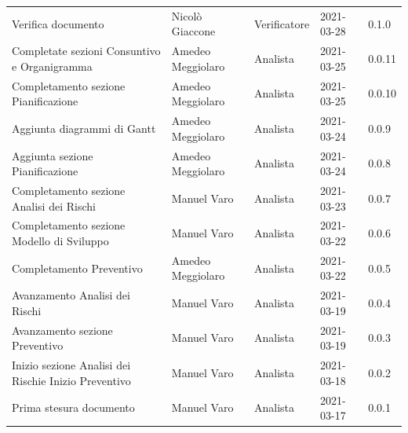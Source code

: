 \documentclass[a4paper]{article}
\begin{document}
\begin{center}
\begin{table}[h!]
\begin{tabular}{p{160px} p{90px} p{70px} p{55px} p{45px}}
            Verifica documento                                                         & Nicolò Giaccone   & Verificatore   & 2021-03-28    & 0.1.0             \\
            Completate sezioni Consuntivo e Organigramma                               & Amedeo Meggiolaro & Analista       & 2021-03-25    & 0.0.11            \\
            Completamento sezione Pianificazione                                       & Amedeo Meggiolaro & Analista       & 2021-03-25    & 0.0.10            \\
            Aggiunta diagrammi di Gantt                                                & Amedeo Meggiolaro & Analista       & 2021-03-24    & 0.0.9             \\
            Aggiunta sezione Pianificazione                                            & Amedeo Meggiolaro & Analista       & 2021-03-24    & 0.0.8             \\
            Completamento sezione Analisi dei Rischi                                   & Manuel Varo       & Analista       & 2021-03-23    & 0.0.7             \\
            Completamento sezione Modello di Sviluppo                                  & Manuel Varo       & Analista       & 2021-03-22    & 0.0.6             \\
            Completamento Preventivo                                                   & Amedeo Meggiolaro & Analista       & 2021-03-22    & 0.0.5             \\
            Avanzamento Analisi dei Rischi                                             & Manuel Varo       & Analista       & 2021-03-19    & 0.0.4             \\
            Avanzamento sezione Preventivo                                             & Manuel Varo       & Analista       & 2021-03-19    & 0.0.3             \\
            Inizio sezione Analisi dei Rischi\newline e Inizio Preventivo              & Manuel Varo       & Analista       & 2021-03-18    & 0.0.2             \\
            Prima stesura documento                                                    & Manuel Varo       & Analista       & 2021-03-17    & 0.0.1             \\
        \end{tabular}
    \end{table}
    
\end{center}

\newpage
\tableofcontents
\newpage
\newpage
\listoffigures
\newpage
\newpage
\listoftables
\newpage






\appendix


\end{document}
